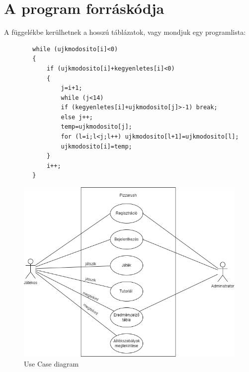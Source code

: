\documentclass[12pt, a4paper]{report}
\theoremstyle{definition}
\begin{document}
	\section{A program forráskódja}
	A függelékbe kerülhetnek a hosszú táblázatok, vagy mondjuk egy programlista:
	\begin{verbatim}
		while (ujkmodosito[i]<0)
		{
			if (ujkmodosito[i]+kegyenletes[i]<0)
			{
				j=i+1;
				while (j<14)
				if (kegyenletes[i]+ujkmodosito[j]>-1) break;
				else j++;
				temp=ujkmodosito[j];
				for (l=i;l<j;l++) ujkmodosito[l+1]=ujkmodosito[l];
				ujkmodosito[i]=temp;
			}
			i++;
		}
	\end{verbatim}
	\begin{figure}[!h]
		\centering
		\includegraphics[width=1\linewidth]{./images/usecase.png}
		\caption{Use Case diagram}
		\label{fig:usecase}
	\end{figure}
\end{document}
